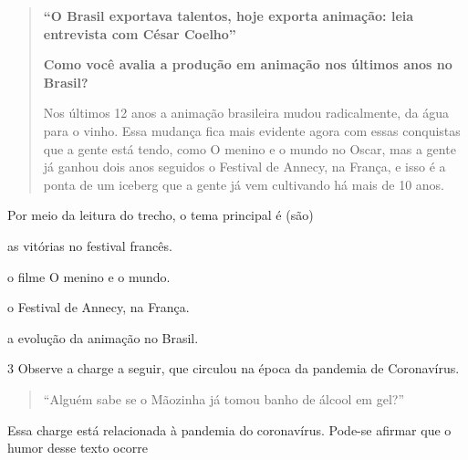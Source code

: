 \begin{quote}
\textbf{``O Brasil exportava talentos, hoje exporta animação: leia
entrevista com César Coelho''}

\textbf{Como você avalia a produção em animação nos últimos anos no
Brasil?}

Nos últimos 12 anos a animação brasileira mudou radicalmente, da água
para o vinho. Essa mudança fica mais evidente agora com essas conquistas
que a gente está tendo, como O menino e o mundo no Oscar, mas a gente já
ganhou dois anos seguidos o Festival de Annecy, na França, e isso é a
ponta de um iceberg que a gente já vem cultivando há mais de 10 anos.

\end{quote}

Por meio da leitura do trecho, o tema principal é (são)

\begin{escolha}
\item as vitórias no festival francês.

\item o filme O menino e o mundo.

\item o Festival de Annecy, na França.

\item a evolução da animação no Brasil.
\end{escolha}

\num{3} Observe a charge a seguir, que circulou na época da pandemia de
Coronavírus.


\begin{quote}
``Alguém sabe se o Mãozinha já tomou banho de álcool em gel?''
\end{quote}

Essa charge está relacionada à pandemia do coronavírus. Pode-se afirmar
que o humor desse texto ocorre

